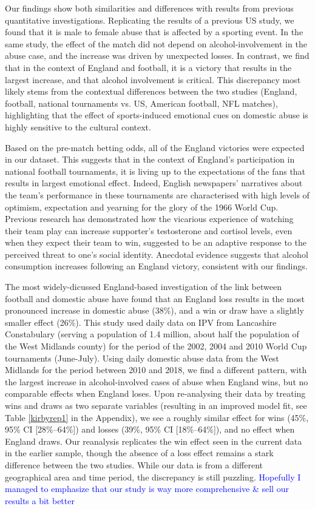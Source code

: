 \documentclass[12pt, letterpaper]{article}
\newcommand{\AT}[1] {{\textcolor{blue}{#1}}}
\begin{document}
Our findings show both similarities and differences with results from previous quantitative investigations. Replicating the results of a previous US study, we found that it is male to female abuse that is affected by a sporting event\autocite{Card2011}. In the same study, the effect of the match did not depend on alcohol-involvement in the abuse case, and the increase was driven by unexpected losses. In contrast, we find that in the context of England and football, it is a victory that results in the largest increase, and that alcohol involvement is critical. This discrepancy most likely stems from the contextual differences between the two studies (England, football, national tournaments vs. US, American football, NFL matches), highlighting that the effect of sports-induced emotional cues on domestic abuse is highly sensitive to the cultural context. 

Based on the pre-match betting odds, all of the England victories were expected in our dataset. This suggests that in the context of England's participation in national football tournaments, it is living up to the expectations of the fans that results in largest emotional effect. Indeed, English newspapers' narratives about the team's performance in these tournaments are characterised with high levels of optimism, expectation and yearning for the glory of the 1966 World Cup\autocite{Vincent2010}. Previous research has demonstrated how the vicarious experience of watching their team play can increase supporter's testosterone and cortisol levels, even when they expect their team to win, suggested to be an adaptive response to the perceived threat to one's social identity\autocite{VanderMeij2012}. Anecdotal evidence suggests that alcohol consumption increases following an England victory\autocite{Davies2018}, consistent with our findings.


The most widely-dicussed England-based investigation of the link between football and domestic abuse have found that an England loss results in the most pronounced increase in domestic abuse (38\%), and a win or draw have a slightly smaller effect (26\%)\autocite{Kirby2014}. This study used daily data on IPV from Lancashire Constabulary (serving a population of 1.4 million, about half the population of the West Midlands county) for the period of the 2002, 2004 and 2010 World Cup tournaments (June-July). 
Using daily domestic abuse data from the West Midlands for the period between 2010 and 2018, we find a different pattern, with the largest increase in alcohol-involved cases of abuse when England wins, but no comparable effects when England loses. Upon re-analysing their data by treating wins and draws as two separate variables (resulting in an improved model fit, see Table \ref{kirbyrep1} in the Appendix), we see a roughly similar effect for wins (45\%, 95\% CI [28\%--64\%]) and losses (39\%, 95\% CI [18\%--64\%]), and no effect when England draws. Our reanalysis replicates the win effect seen in the current data in the earlier sample, though the absence of a loss effect remains a stark difference between the two studies. While our data is from a different geographical area and time period, the discrepancy is still puzzling. \AT{Hopefully I managed to emphasize that our study is way more comprehensive \& sell our results a bit better}
\end{document}
